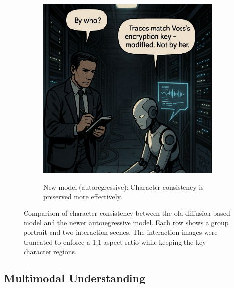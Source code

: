 \begin{figure}[t]
\begin{subfigure}[t]{\textwidth}
\begin{minipage}[t]{0.3\textwidth}
            \label{fig:char-new-s1}
        \end{minipage}
        \hspace{0.01\textwidth}
        \begin{minipage}[t]{0.3\textwidth}
            \centering
            \includegraphics[width=\linewidth]{resources/characters_s2}
            \label{fig:char-new-s2}
        \end{minipage}
        \caption{New model (autoregressive): Character consistency is preserved more effectively.}
        \label{fig:char-new-row}
    \end{subfigure}

    \caption{Comparison of character consistency between the old diffusion-based model and the newer autoregressive model. Each row shows a group portrait and two interaction scenes. The interaction images were truncated to enforce a 1:1 aspect ratio while keeping the key character regions.}
    \label{fig:character-consistency-comparison}
\end{figure}

\subsection{Multimodal Understanding}\label{subsec:multimodal-understanding}

